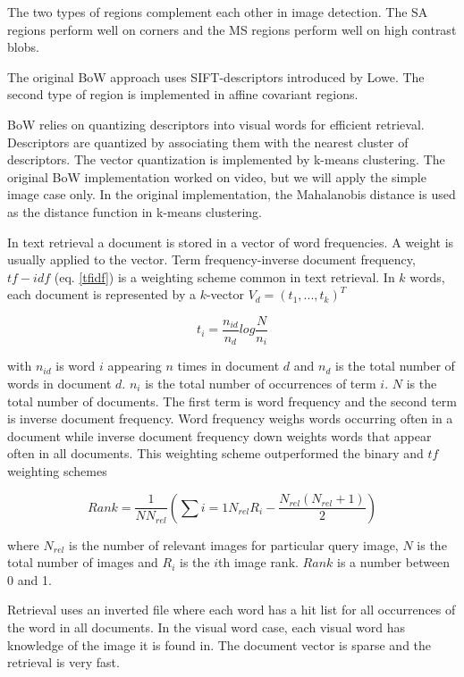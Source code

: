 \documentclass[english,12pt,a4paper,pdftex,elec,utf8, table]{aaltothesis}
\begin{document}
The two types of regions complement each other in image detection. The SA regions perform well on corners and the MS regions perform well on high contrast blobs. \cite{Sivic2003}

The original BoW approach uses SIFT-descriptors introduced by Lowe. The second type of region is implemented in affine covariant regions.

BoW relies on quantizing descriptors into visual words for efficient retrieval. Descriptors are quantized by associating them with the nearest cluster of descriptors. The vector quantization is implemented by k-means clustering. \cite{Sivic2003} The original BoW implementation worked on video, but we will apply the simple image case only. In the original implementation, the Mahalanobis distance is used as the distance function in k-means clustering.

In text retrieval a document is stored in a vector of word frequencies. A weight is usually applied to the vector. Term frequency-inverse document frequency, $tf-idf$ (eq. \ref{tfidf}) is a weighting scheme common in text retrieval. In $k$ words, each document is represented by a $k$-vector $V_{d}=(t_{1},...,t_{k})^{T}$

\begin{equation}\label{tfidf}
t_{i} = \frac{n_{id}}{n_{d}}log\frac{N}{n_{i}}
\end{equation}

with $n_{id}$ is word $i$ appearing $n$ times in document $d$ and $n_{d}$ is the total number of words in document $d$. $n_{i}$ is the total number of occurrences of term $i$. $N$ is the total number of documents. The first term is word frequency and the second term is inverse document frequency. Word frequency weighs words occurring often in a document while inverse document frequency down weights words that appear often in all documents. This weighting scheme outperformed the binary and $tf$ weighting schemes\cite{Sivic2003}

\begin{equation}\label{bowrank}
  Rank = \frac{1}{NN_{rel}}\left(\sum{i=1}{N_{rel}}R_{i}-\frac{N_{rel}(N_{rel} + 1)}{2}\right)
\end{equation}

where $N_{rel}$ is the number of relevant images for particular query image, $N$ is the total number of images and $R_{i}$ is the $i$th image rank. $Rank$ is a number between 0 and 1.

Retrieval uses an inverted file where each word has a hit list for all occurrences of the word in all documents. In the visual word case, each visual word has knowledge of the image it is found in. The document vector is sparse and the retrieval is very fast.
\end{document}
